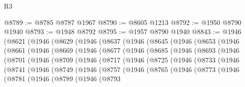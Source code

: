 \begin{lexlean}{R3}
\begin{coremodule}
@8789 := @8785 @8787 @1967
@8790 := @8605 @1213
@8792 := @1950 @8790 @1940
@8793 := @1948 @8792
@8795 := @1957 @8790 @1940
@8843 := @1946
    (@8621
      (@1946
        (@8629
          (@1946
            (@8637
              (@1946
                (@8645
                  (@1946
                    (@8653
                      (@1946
                        (@8661
                          (@1946
                            (@8669
                              (@1946
                                (@8677
                                  (@1946
                                    (@8685
                                      (@1946
                                        (@8693
                                          (@1946
                                            (@8701
                                              (@1946
                                                (@8709
                                                  (@1946
                                                    (@8717
                                                      (@1946
                                                        (@8725
                                                          (@1946
                                                            (@8733
                                                              (@1946
                                                                (@8741
                                                                  (@1946
                                                                    (@8749
                                                                      (@1946
                                                                        (@8757
                                                                          (@1946
                                                                            (@8765
                                                                              (@1946
                                                                                (@8773
                                                                                  (@1946
                                                                                    (@8781
                                                                                      (@1946
                                                                                        (@8789
                                                                                          (@1946
                                                                                            (@8793

\end{coremodule}
\end{lexlean}
